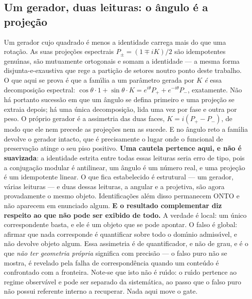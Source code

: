 \documentclass[11pt]{article}
\theoremstyle{definition}\newtheorem{deriv}{Derivação}
\begin{document}
\subsection*{Um gerador, duas leituras: o \^angulo \'e a proje\c{c}\~ao}Um gerador cujo quadrado \'e menos a identidade carrega mais do que uma rota\c{c}\~ao. As suas proje\c{c}\~oes espectrais $P_\pm = (1 \mp iK)/2$ s\~ao idempotentes genu\'\i{}nas, s\~ao mutuamente ortogonais e somam a identidade --- a mesma forma disjunta-e-exaustiva que rege a parti\c{c}\~ao de setores noutro ponto deste trabalho. O que aqui se prova \'e que a fam\'\i{}lia a um par\^ametro gerada por $K$ \emph{\'e} essa decomposi\c{c}\~ao espectral: $\cos\theta\cdot 1 + \sin\theta\cdot K = e^{i\theta}P_+ + e^{-i\theta}P_-$, exatamente. N\~ao h\'a portanto sucess\~ao em que um \^angulo se defina primeiro e uma proje\c{c}\~ao se extraia depois; h\'a uma \'unica decomposi\c{c}\~ao, lida uma vez por fase e outra por peso. O pr\'oprio gerador \'e a assimetria das duas faces, $K = i(P_+ - P_-)$, de modo que ele nem precede as proje\c{c}\~oes nem as sucede. E no \^angulo reto a fam\'\i{}lia devolve o gerador intacto, que \'e precisamente o lugar onde o funcional de preserva\c{c}\~ao atinge o seu piso positivo. \textbf{Uma cautela pertence aqui, e n\~ao \'e suavizada}: a identidade estrita entre todas essas leituras seria erro de tipo, pois a conjuga\c{c}\~ao modular \'e antilinear, um \^angulo \'e um n\'umero real, e uma proje\c{c}\~ao \'e um idempotente linear. O que fica estabelecido \'e estrutural --- um gerador, v\'arias leituras --- e duas dessas leituras, a angular e a projetiva, s\~ao agora provadamente o mesmo objeto. Identifica\c{c}\~oes al\'em disso permanecem \textsf{ONTO} e n\~ao aparecem em enunciado algum. \textbf{E o resultado complementar diz respeito ao que n\~ao pode ser exibido de todo.} A verdade \'e local: um \'unico correspondente basta, e ele \'e um objeto que se pode apontar. O falso \'e global: afirmar que nada corresponde \'e quantificar sobre todo o dom\'\i{}nio admiss\'\i{}vel, e n\~ao devolve objeto algum. Essa assimetria \'e de quantificador, e n\~ao de grau, e \'e o que \emph{n\~ao ter geometria pr\'opria} significa com precis\~ao --- o falso puro n\~ao se mostra, \'e revelado pela falha de correspond\^encia quando um conte\'udo \'e confrontado com a fronteira. Note-se que isto n\~ao \'e ru\'\i{}do: o ru\'\i{}do pertence ao regime observ\'avel e pode ser separado da sistem\'atica, ao passo que o falso puro n\~ao possui referente interno a recuperar. Nada aqui move o gate.
\end{document}
